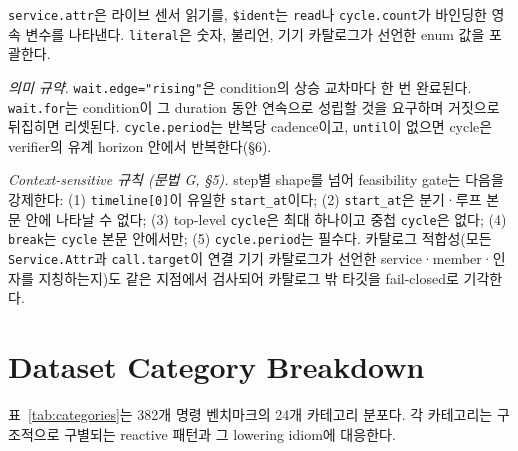 \documentclass[sigconf,nonacm,anonymous,review]{acmart}
\begin{document}
\noindent\texttt{service.attr}은 라이브 센서 읽기를, \texttt{\$}\texttt{ident}는 \texttt{read}나 \texttt{cycle.count}가 바인딩한 영속 변수를 나타낸다. \texttt{literal}은 숫자, 불리언, 기기 카탈로그가 선언한 enum 값을 포괄한다.

\noindent\emph{의미 규약.} \texttt{wait.edge="rising"}은 condition의 상승 교차마다 한 번 완료된다. \texttt{wait.for}는 condition이 그 duration 동안 연속으로 성립할 것을 요구하며 거짓으로 뒤집히면 리셋된다. \texttt{cycle.period}는 반복당 cadence이고, \texttt{until}이 없으면 cycle은 verifier의 유계 horizon 안에서 반복한다(\S6).

\noindent\emph{Context-sensitive 규칙 (문법 G, \S5).} step별 shape를 넘어 feasibility gate는 다음을 강제한다: (1) \texttt{timeline[0]}이 유일한 \texttt{start\_at}이다; (2) \texttt{start\_at}은 분기·루프 본문 안에 나타날 수 없다; (3) top-level \texttt{cycle}은 최대 하나이고 중첩 \texttt{cycle}은 없다; (4) \texttt{break}는 \texttt{cycle} 본문 안에서만; (5) \texttt{cycle.period}는 필수다. 카탈로그 적합성(모든 \texttt{Service.Attr}과 \texttt{call.target}이 연결 기기 카탈로그가 선언한 service·member·인자를 지칭하는지)도 같은 지점에서 검사되어 카탈로그 밖 타깃을 fail-closed로 기각한다.

\section{Dataset Category Breakdown}
\label{app:categories}

표~\ref{tab:categories}는 382개 명령 벤치마크의 24개 카테고리 분포다. 각 카테고리는 구조적으로 구별되는 reactive 패턴과 그 lowering idiom에 대응한다.
\end{document}

